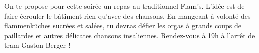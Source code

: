 On te propose pour cette soirée un repas au traditionnel Flam's. L'idée est 
de faire écrouler le bâtiment rien qu'avec des chansons. En mangeant
à volonté des flammenküches sucrées et salées, tu devras défier les orgas à
grands coups de paillardes et autres délicates chansons insaliennes. Rendez-vous
à 19h à l'arrêt de tram Gaston Berger !
